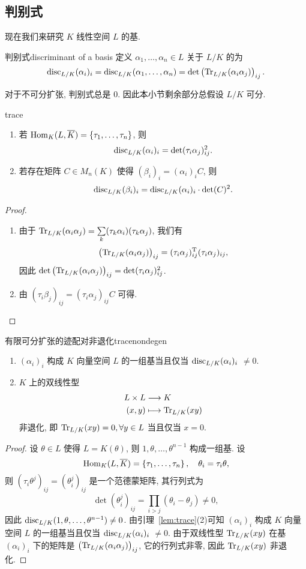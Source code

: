 \subsection{判别式}
现在我们来研究 $K$ 线性空间 $L$ 的基.
\begin{definition}{判别式}{discriminant of a basis}
定义 $\alpha_1,\dots,\alpha_n\in L$ 关于 $L/K$ 的为
	\[{\mathrm{disc}}_{L/K}(\alpha_i)_i={\mathrm{disc}}_{L/K}(\alpha_1,\dots,\alpha_n)=\det\left({\mathrm{Tr}}_{L/K}(\alpha_i\alpha_j)\right)_{ij}.\]
\end{definition}
对于不可分扩张, 判别式总是 $0$.
因此本小节剩余部分总\alert{假设 $L/K$ 可分}.
	
\begin{lemma}{}{trace}
\begin{enumerate}
	\item 若 ${\mathrm{Hom}}_K(L,\overline K)=\left\{\tau_1,\dots,\tau_n\right\}$, 则
	\[{\mathrm{disc}}_{L/K}(\alpha_i)_i=\det(\tau_i \alpha_j)_{ij}^2.\]
	\item 若存在矩阵 $C\in M_n(K)$ 使得 $(\beta_i)_i=(\alpha_i)_i C$, 则
	\[{\mathrm{disc}}_{L/K}(\beta_i)_i={\mathrm{disc}}_{L/K}(\alpha_i)_i\cdot\det(C)^2.\]
\end{enumerate}
\end{lemma}
\begin{proof}
\begin{enumerate}
	\item 由于 ${\mathrm{Tr}}_{L/K}(\alpha_i\alpha_j)=\sum\limits_k (\tau_k\alpha_i)(\tau_k\alpha_j)$, 我们有 
	\[\left({\mathrm{Tr}}_{L/K}(\alpha_i\alpha_j)\right)_{ij}=(\tau_i\alpha_j)_{ij}^{\mathrm{T}}(\tau_i\alpha_j)_{ij},\]
因此 $\det\left({\mathrm{Tr}}_{L/K}(\alpha_i\alpha_j)\right)_{ij}=\det(\tau_i\alpha_j)_{ij}^2$.
	\item 由 $(\tau_i\beta_j)_{ij}=(\tau_i\alpha_j)_{ij}C$ 可得.
\end{enumerate}
\end{proof}

\begin{proposition}{有限可分扩张的迹配对非退化}{tracenondegen}
\begin{enumerate}
	\item $(\alpha_i)_i$ 构成 $K$ 向量空间 $L$ 的一组基当且仅当 ${\mathrm{disc}}_{L/K}(\alpha_i)_i$ $\neq 0$.
	\item $K$ 上的双线性型 
	\[\begin{split}L\times L &\longrightarrow K \\ (x,y) &\longmapsto {\mathrm{Tr}}_{L/K}(xy)\end{split}\]
	非退化, 即 ${\mathrm{Tr}}_{L/K}(xy)=0,\forall y\in L$ 当且仅当 $x=0$.
\end{enumerate}
\end{proposition}
\begin{proof}
设 $\theta\in L$ 使得 $L=K(\theta)$, 则 $1,\theta,\dots,\theta^{n-1}$ 构成一组基. 设 
	\[{\mathrm{Hom}}_K(L,\overline K)=\left\{\tau_1,\dots,\tau_n\right\},\quad \theta_i=\tau_i \theta,\]
则 $(\tau_i \theta^j)_{ij}=(\theta_i^j)_{ij}$ 是一个范德蒙矩阵, 其行列式为
	\[\det(\theta_i^j)_{ij}=\prod_{i>j}(\theta_i-\theta_j)\neq 0,\]
因此 ${\mathrm{disc}}_{L/K}(1,\theta,\dots,\theta^{n-1})\neq 0$. 由引理~\ref{lem:trace}(2)可知 $(\alpha_i)_i$ 构成 $K$ 向量空间 $L$ 的一组基当且仅当 ${\mathrm{disc}}_{L/K}(\alpha_i)_i$ $\neq 0$.
由于双线性型 ${\mathrm{Tr}}_{L/K}(xy)$ 在基 $(\alpha_i)_i$ 下的矩阵是 $\left({\mathrm{Tr}}_{L/K}(\alpha_i\alpha_j)\right)_{ij}$, 它的行列式非零, 因此 ${\mathrm{Tr}}_{L/K}(xy)$ 非退化.
\end{proof}

